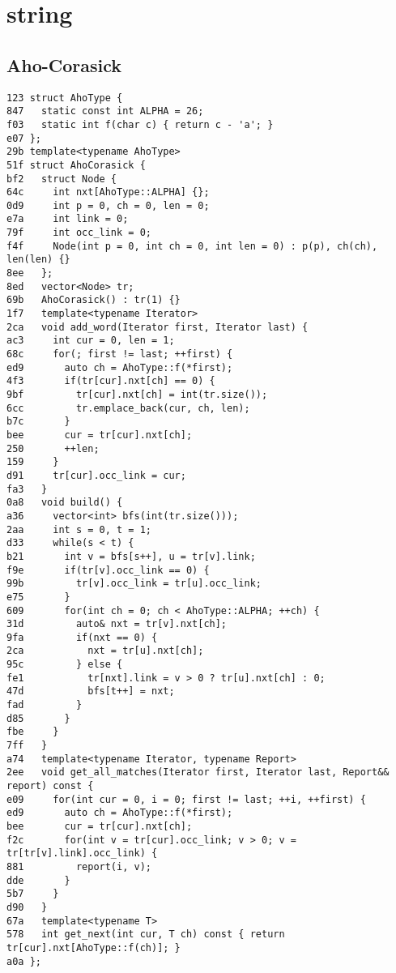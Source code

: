 \documentclass[10pt, a4paper, twoside]{article}
\begin{document}
%
%

\section{string}

\subsection{Aho-Corasick}
\begin{lstlisting}
123 struct AhoType {
847   static const int ALPHA = 26;
f03   static int f(char c) { return c - 'a'; }
e07 };
29b template<typename AhoType>
51f struct AhoCorasick {
bf2   struct Node {
64c     int nxt[AhoType::ALPHA] {};
0d9     int p = 0, ch = 0, len = 0;
e7a     int link = 0;
79f     int occ_link = 0;
f4f     Node(int p = 0, int ch = 0, int len = 0) : p(p), ch(ch), len(len) {}
8ee   };
8ed   vector<Node> tr;
69b   AhoCorasick() : tr(1) {}
1f7   template<typename Iterator>
2ca   void add_word(Iterator first, Iterator last) {
ac3     int cur = 0, len = 1;
68c     for(; first != last; ++first) {
ed9       auto ch = AhoType::f(*first);
4f3       if(tr[cur].nxt[ch] == 0) {
9bf         tr[cur].nxt[ch] = int(tr.size());
6cc         tr.emplace_back(cur, ch, len);
b7c       }
bee       cur = tr[cur].nxt[ch];
250       ++len;
159     }
d91     tr[cur].occ_link = cur;
fa3   }
0a8   void build() {
a36     vector<int> bfs(int(tr.size()));
2aa     int s = 0, t = 1;
d33     while(s < t) {
b21       int v = bfs[s++], u = tr[v].link;
f9e       if(tr[v].occ_link == 0) {
99b         tr[v].occ_link = tr[u].occ_link;
e75       }
609       for(int ch = 0; ch < AhoType::ALPHA; ++ch) {
31d         auto& nxt = tr[v].nxt[ch];
9fa         if(nxt == 0) {
2ca           nxt = tr[u].nxt[ch];
95c         } else {
fe1           tr[nxt].link = v > 0 ? tr[u].nxt[ch] : 0;
47d           bfs[t++] = nxt;
fad         }
d85       }
fbe     }
7ff   }
a74   template<typename Iterator, typename Report>
2ee   void get_all_matches(Iterator first, Iterator last, Report&& report) const {
e09     for(int cur = 0, i = 0; first != last; ++i, ++first) {
ed9       auto ch = AhoType::f(*first);
bee       cur = tr[cur].nxt[ch];
f2c       for(int v = tr[cur].occ_link; v > 0; v = tr[tr[v].link].occ_link) {
881         report(i, v);
dde       }
5b7     }
d90   }
67a   template<typename T>
578   int get_next(int cur, T ch) const { return tr[cur].nxt[AhoType::f(ch)]; }
a0a };
\end{lstlisting}
\end{document}
